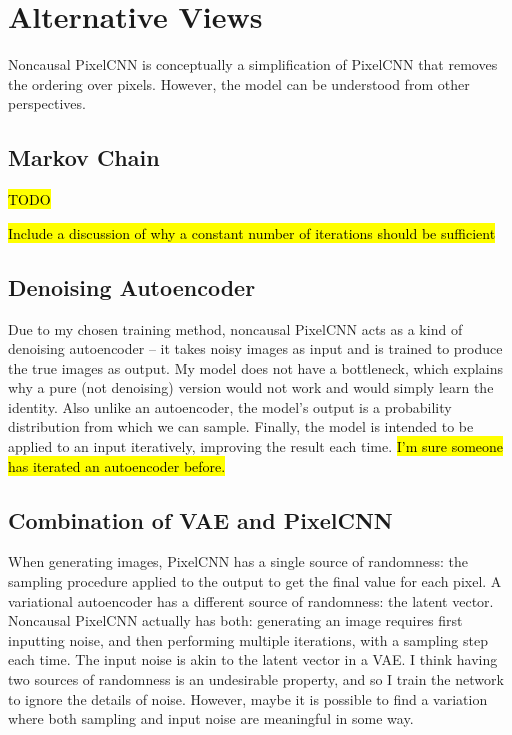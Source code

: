 \documentclass[10pt,a4paper]{article}
\begin{document}
\section{Alternative Views}

Noncausal PixelCNN is conceptually a simplification of PixelCNN that removes the ordering over pixels. However, the model can be understood from other perspectives.

\subsection{Markov Chain} \label{markovchain}

\hl{TODO}

\hl{Include a discussion of why a constant number of iterations should be sufficient}

\citep{brnndenoise}

\subsection{Denoising Autoencoder}

Due to my chosen training method, noncausal PixelCNN acts as a kind of denoising autoencoder \citep{denoisingautoencoder, stackeddenoising} -- it takes noisy images as input and is trained to produce the true images as output. My model does not have a bottleneck, which explains why a pure (not denoising) version would not work and would simply learn the identity. Also unlike an autoencoder, the model's output is a probability distribution from which we can sample. Finally, the model is intended to be applied to an input iteratively, improving the result each time. \hl{I'm sure someone has iterated an autoencoder before.}

\subsection{Combination of VAE and PixelCNN}

When generating images, PixelCNN has a single source of randomness: the sampling procedure applied to the output to get the final value for each pixel. A variational autoencoder \citep{vae} has a different source of randomness: the latent vector. Noncausal PixelCNN actually has both: generating an image requires first inputting noise, and then performing multiple iterations, with a sampling step each time. The input noise is akin to the latent vector in a VAE. I think having two sources of randomness is an undesirable property, and so I train the network to ignore the details of noise. However, maybe it is possible to find a variation where both sampling and input noise are meaningful in some way.
\end{document}
